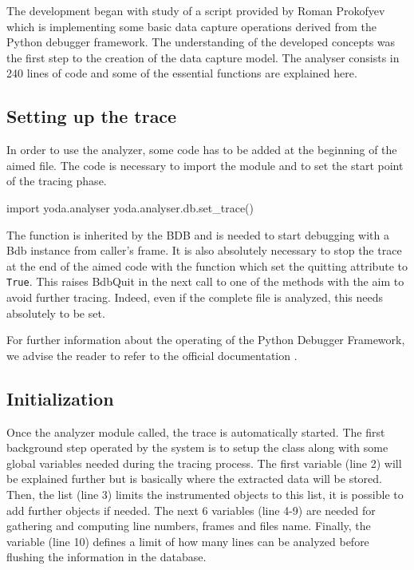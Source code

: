 The development began with study of a script provided by Roman Prokofyev which is implementing some basic data capture operations derived from the Python debugger framework. The understanding of the developed concepts was the first step to the creation of the data capture model. The analyser consists in 240 lines of code and some of the essential functions are explained here.

\subsection{Setting up the trace}
In order to use the analyzer, some code has to be added at the beginning of the aimed file. The code is necessary to import the module and to set the start point of the tracing phase. 
\begin{python}
import yoda.analyser
yoda.analyser.db.set_trace()
\end{python}

The  function is inherited by the BDB and is needed to start debugging with a Bdb instance from caller’s frame.
It is also absolutely necessary to stop the trace at the end of the aimed code with the  function which set the quitting attribute to \texttt{True}. This raises BdbQuit in the next call to one of the  methods with the aim to avoid further tracing. Indeed, even if the complete file is analyzed, this needs absolutely to be set. 

For further information about the operating of the Python Debugger Framework, we advise the reader to refer to the official documentation \citep{Foundation2017}.

\subsection{Initialization}

Once the analyzer module called, the trace is automatically started. The first background step operated by the system is to setup the  class along with some global variables needed during the tracing process. The first variable  (line 2) will be explained further but is basically where the extracted data will be stored. Then, the  list (line 3) limits the instrumented objects to this list, it is possible to add further objects if needed. The next 6 variables (line 4-9) are needed for gathering and computing line numbers, frames and files name. Finally, the  variable (line 10) defines a limit of how many lines can be analyzed before flushing the information in the database.

